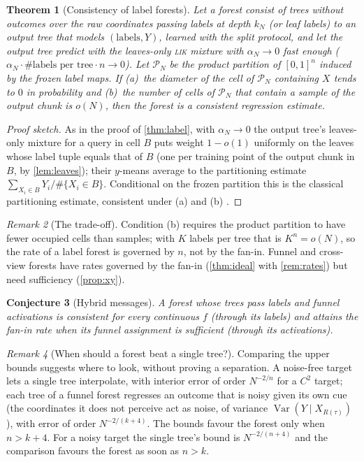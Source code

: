\documentclass[11pt]{article}
\newtheorem{theorem}{Theorem}
\newtheorem{conjecture}[theorem]{Conjecture}
\theoremstyle{definition}
\theoremstyle{remark}
\newtheorem{remark}[theorem]{Remark}
\newcommand{\Var}{\operatorname{Var}}
\begin{document}
\begin{theorem}[Consistency of label forests]\label{thm:labelcons}
Let a forest consist of trees without outcomes over the raw coordinates passing labels
at depth $k_N$ (or leaf labels) to an output tree that models $(\text{labels},Y)$, learned
with the split protocol, and let the output tree predict with the leaves-only
\textsc{lik} mixture with $\alpha_N\to0$ fast enough
($\alpha_N\cdot\#\text{labels per tree}\cdot n\to0$).  Let $\mathcal P_N$ be the product
partition of $[0,1]^n$ induced by the frozen label maps.  If (a)~the diameter of the cell
of $\mathcal P_N$ containing $X$ tends to $0$ in probability and (b)~the number of cells
of $\mathcal P_N$ that contain a sample of the output chunk is $o(N)$, then the forest is
a consistent regression estimate.
\end{theorem}
\begin{proof}[Proof sketch]
As in the proof of \cref{thm:label}, with $\alpha_N\to0$ the output tree's leaves-only
mixture for a query in cell $B$ puts weight $1-o(1)$ uniformly on the leaves whose
label tuple equals that of $B$ (one per training point of the output chunk in $B$, by
\cref{lem:leaves}); their $y$-means average to the partitioning estimate
$\sum_{X_i\in B}Y_i/\#\{X_i\in B\}$.  Conditional on the frozen partition this is the
classical partitioning estimate, consistent under (a) and (b) \citep[Thm.~4.2]{gyorfi2002}.
\end{proof}

\begin{remark}[The trade-off]\label{rem:tradeoff}
Condition (b) requires the product partition to have fewer occupied cells than samples;
with $K$ labels per tree that is $K^n=o(N)$, so the rate of a label forest is governed by
$n$, not by the fan-in.  Funnel and cross-view forests have rates governed by the fan-in
(\cref{thm:ideal} with \cref{rem:rates}) but need sufficiency (\cref{prop:xy}).
\end{remark}

\begin{conjecture}[Hybrid messages]\label{conj:hybrid}
A forest whose trees pass labels and funnel activations is consistent for every
continuous $f$ (through its labels) and attains the fan-in rate when its funnel
assignment is sufficient (through its activations).
\end{conjecture}

\begin{remark}[When should a forest beat a single tree?]\label{rem:crossover}
Comparing the upper bounds suggests where to look, without proving a separation.  A
noise-free target lets a single tree interpolate, with interior error of order
$N^{-2/n}$ for a $C^2$ target; each tree of a funnel forest regresses an outcome that is
noisy given its own cue (the coordinates it does not perceive act as noise, of variance
$\Var(Y\mid X_{R(\tau)})$), with error of order $N^{-2/(k+4)}$.  The bounds favour the
forest only when $n>k+4$.  For a noisy target the single tree's bound is
$N^{-2/(n+4)}$ and the comparison favours the forest as soon as $n>k$.
\end{remark}
\end{document}
